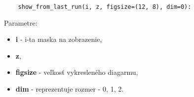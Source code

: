 \vspace{32pt}
\begin{lstlisting}
    show_from_last_run(i, z, figsize=(12, 8), dim=0):
\end{lstlisting}

Parametre:
\begin{itemize}
    \item \textbf{i} - i-ta maska na zobrazenie,
    \item \textbf{z},
    \item \textbf{figsize} - veľkosť vykresleného diagarmu,
    \item \textbf{dim} - reprezentuje rozmer - 0, 1, 2.
\end{itemize}

\thispagestyle{empty}
\mbox{}
\newpage